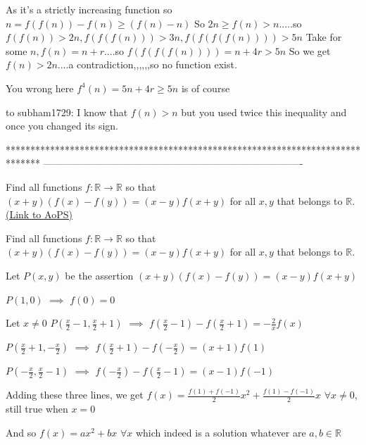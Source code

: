 \begin{solution}
	\begin{tcolorbox}As it's a strictly increasing function so $n=f(f(n))-f(n)\geq (f(n)-n)$
So $2n\geq f(n)>n$.....so $f(f(n))>2n,f(f(f(n)))>3n,f(f(f(f(n))))>5n$
Take for some $n, f(n)=n+r$....so $f(f(f(f(n))))=n+4r>5n$
So we get $f(n)>2n$....a contradiction,,,,,,so no function exist.\end{tcolorbox}
You wrong here 
$f^4(n)=5n+4r \ge 5n$ is of course
\end{solution}



\begin{solution}
	to subham1729: I know that $ f(n)>n $ but you used twice this inequality and once you changed its sign.
\end{solution}
*******************************************************************************
-------------------------------------------------------------------------------

\begin{problem}
	Find all functions $f:\mathbb{R}\to\mathbb{R}$ so that $(x+y)(f(x)-f(y))=(x-y)f(x+y)$ for all $x,y$ that belongs to $\mathbb{R}$.
	\flushright \href{https://artofproblemsolving.com/community/c6h486615}{(Link to AoPS)}
\end{problem}



\begin{solution}
	\begin{tcolorbox}Find all functions $f:\mathbb{R}\to\mathbb{R}$ so that $(x+y)(f(x)-f(y))=(x-y)f(x+y)$ for all $x,y$ that belongs to $\mathbb{R}$.\end{tcolorbox}
Let $P(x,y)$ be the assertion $(x+y)(f(x)-f(y))=(x-y)f(x+y)$

$P(1,0)$ $\implies$ $f(0)=0$

Let $x\ne 0$
$P(\frac x2-1,\frac x2+1)$ $\implies$ $f(\frac x2-1)-f(\frac x2+1)=-\frac 2xf(x)$

$P(\frac x2+1,-\frac x2)$ $\implies$ $f(\frac x2+1)-f(-\frac x2)=(x+1)f(1)$

$P(-\frac x2,\frac x2-1)$ $\implies$ $f(-\frac x2)-f(\frac x2-1)=(x-1)f(-1)$

Adding these three lines, we get $f(x)=\frac{f(1)+f(-1)}2x^2+\frac{f(1)-f(-1)}2x$ $\forall x\ne 0$, still true when $x=0$

And so $\boxed{f(x)=ax^2+bx}$ $\forall x$ which indeed is a solution whatever are $a,b\in\mathbb R$
\end{solution}




